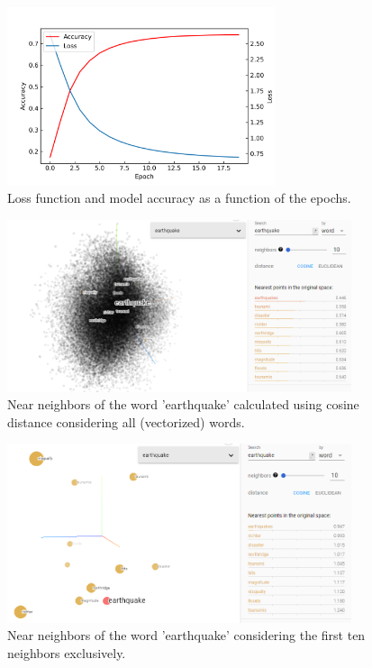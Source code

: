 \documentclass{article}
\begin{document}
\begin{figure}[h!]
    \centering
    \includegraphics[width = 0.7\textwidth]{images/loss_accuracy_2.png}
    \caption{Loss function and model accuracy as a function of the epochs. }
    \label{fig:loss_acc}
\end{figure}

\begin{figure}[h!]
    \centering
    \includegraphics[width = 0.9\textwidth, height = 0.57\textwidth]{images/earthquake_nearest_neighbors.png}
    \caption{Near neighbors of the word 'earthquake' calculated using cosine distance considering all (vectorized) words.}
    \label{fig:NN}
\end{figure}

\begin{figure}[h!]
    \centering
    \includegraphics[width = 0.9\textwidth, height = 0.6\textwidth]{images/earthquake_nearest_neighbors_isolated.png}
    \caption{Near neighbors of the word 'earthquake' considering the first ten neighbors exclusively.}
    \label{fig:NN_iso}
\end{figure}
\end{document}
